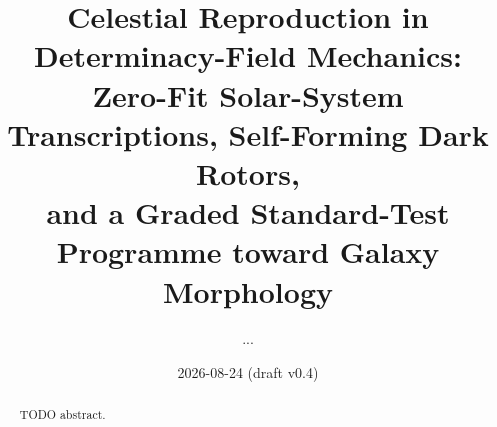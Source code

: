 \documentclass[aps,reprint,amsmath,amssymb,nofootinbib,superscriptaddress,floatfix]{revtex4-2}
\begin{document}
\title{Celestial Reproduction in Determinacy-Field Mechanics:\\
Zero-Fit Solar-System Transcriptions, Self-Forming Dark Rotors,\\
and a Graded Standard-Test Programme toward Galaxy Morphology}

\author{...}
\date{2026-08-24 (draft v0.4)}

\begin{abstract}
TODO abstract.
\end{abstract}

\maketitle
\end{document}
